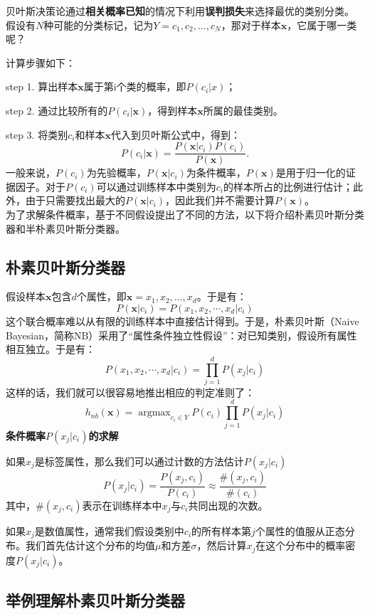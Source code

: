 ​
贝叶斯决策论通过\textbf{相关概率已知}的情况下利用\textbf{误判损失}来选择最优的类别分类。\\
假设有$N$种可能的分类标记，记为$Y={c_1,c_2,...,c_N}$，那对于样本$\boldsymbol{x}$，它属于哪一类呢？

计算步骤如下：

step 1. 算出样本$\boldsymbol{x}$属于第i个类的概率，即$P(c_i|x)​$；

step 2.
通过比较所有的$P(c_i|\boldsymbol{x})$，得到样本$\boldsymbol{x}$所属的最佳类别。

step 3. 将类别$c_i$和样本$\boldsymbol{x}$代入到贝叶斯公式中，得到：
\[
P(c_i|\boldsymbol{x})=\frac{P(\boldsymbol{x}|c_i)P(c_i)}{P(\boldsymbol{x})}.
\] ​
一般来说，$P(c_i)$为先验概率，$P(\boldsymbol{x}|c_i)$为条件概率，$P(\boldsymbol{x})$是用于归一化的证据因子。对于$P(c_i)$可以通过训练样本中类别为$c_i$的样本所占的比例进行估计；此外，由于只需要找出最大的$P(\boldsymbol{x}|c_i)$，因此我们并不需要计算$P(\boldsymbol{x})$。\\
​
为了求解条件概率，基于不同假设提出了不同的方法，以下将介绍朴素贝叶斯分类器和半朴素贝叶斯分类器。

\subsection{朴素贝叶斯分类器}\label{ux6734ux7d20ux8d1dux53f6ux65afux5206ux7c7bux5668}

​
假设样本$\boldsymbol{x}$包含$d$个属性，即$\boldsymbol{x}={ x_1,x_2,...,x_d}$。于是有：
\[
P(\boldsymbol{x}|c_i)=P(x_1,x_2,\cdots,x_d|c_i)
\]
这个联合概率难以从有限的训练样本中直接估计得到。于是，朴素贝叶斯（Naive
Bayesian，简称NB）采用了``属性条件独立性假设''：对已知类别，假设所有属性相互独立。于是有：
\[
P(x_1,x_2,\cdots,x_d|c_i)=\prod_{j=1}^d P(x_j|c_i)
\] 这样的话，我们就可以很容易地推出相应的判定准则了： \[
h_{nb}(\boldsymbol{x})=\mathop{\arg \max}_{c_i\in Y} P(c_i)\prod_{j=1}^dP(x_j|c_i)
\] \textbf{条件概率$P(x_j|c_i)​$的求解}

如果$x_j$是标签属性，那么我们可以通过计数的方法估计$P(x_j|c_i)$ \[
P(x_j|c_i)=\frac{P(x_j,c_i)}{P(c_i)}\approx\frac{\#(x_j,c_i)}{\#(c_i)}
\]
其中，$\#(x_j,c_i)$表示在训练样本中$x_j$与$c_{i}$共同出现的次数。

如果$x_j​$是数值属性，通常我们假设类别中$c_{i}​$的所有样本第$j​$个属性的值服从正态分布。我们首先估计这个分布的均值$μ​$和方差$σ​$，然后计算$x_j​$在这个分布中的概率密度$P(x_j|c_i)​$。

\subsection{举例理解朴素贝叶斯分类器}\label{ux4e3eux4f8bux7406ux89e3ux6734ux7d20ux8d1dux53f6ux65afux5206ux7c7bux5668}

